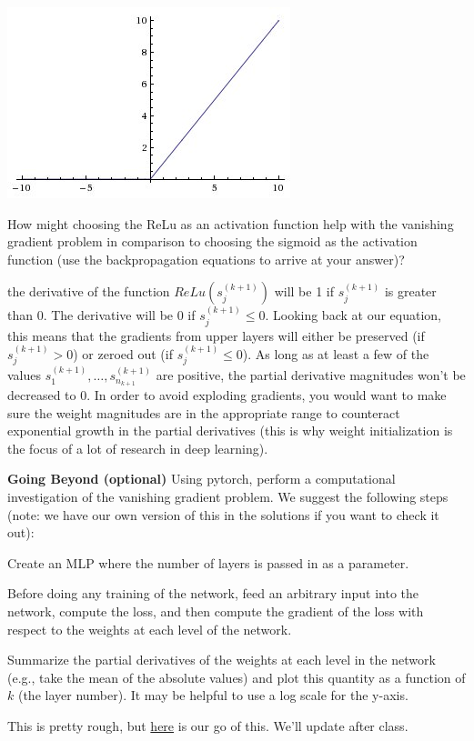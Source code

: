 \documentclass[assignment07_Solutions]{subfiles}
\begin{document}
\begin{exercise}
\begin{center}
\includegraphics[width=0.4\linewidth]{figures/relu}
\end{center}

How might choosing the ReLu as an activation function help with the vanishing gradient problem in comparison to choosing the sigmoid as the activation function (use the backpropagation equations to arrive at your answer)?

\begin{boxedsolution}
the derivative of the function $ReLu(s^{(k+1)}_{j})$ will be 1 if $s^{(k+1)}_{j}$ is greater than 0.  The derivative will be 0 if $s^{(k+1)}_{j} \leq 0$.  Looking back at our equation, this means that the gradients from upper layers will either be preserved (if $s^{(k+1)}_{j} > 0$) or zeroed out (if $s^{(k+1)}_{j} \leq 0$).  As long as at least a few of the values $s^{(k+1)}_{1}, \ldots, s^{(k+1)}_{n_{k+1}}$ are positive, the partial derivative magnitudes won't be decreased to 0.  In order to avoid exploding gradients, you would want to make sure the weight magnitudes are in the appropriate range to counteract exponential growth in the partial derivatives (this is why weight initialization is the focus of a lot of research in deep learning).
\end{boxedsolution}

\item \textbf{Going Beyond (optional)} Using pytorch, perform a computational investigation of the vanishing gradient problem.  We suggest the following steps (note: we have our own version of this in the solutions if you want to check it out):
\bi
\item Create an MLP where the number of layers is passed in as a parameter.
\item Before doing any training of the network, feed an arbitrary input into the network, compute the loss, and then compute the gradient of the loss with respect to the weights at each level of the network.
\item Summarize the partial derivatives of the weights at each level in the network (e.g., take the mean of the absolute values) and plot this quantity as a function of $k$ (the layer number).  It may be helpful to use a log scale for the y-axis.
\ei
\ees
\begin{boxedsolution}
This is pretty rough, but \href{https://colab.research.google.com/drive/1lGlW-rnBnT-wh48HmNJlNb43FJuFQn01}{here} is our go of this.  We'll update after class.
\end{boxedsolution}
\end{exercise}
\end{document}

